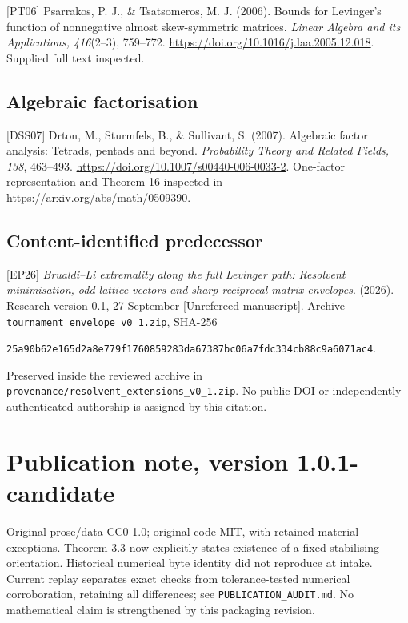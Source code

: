 \documentclass[
  11pt,
  a4paper,
]{article}
\begin{document}
{[}PT06{]} Psarrakos, P. J., \& Tsatsomeros, M. J. (2006). Bounds for
Levinger's function of nonnegative almost skew-symmetric matrices.
\emph{Linear Algebra and its Applications, 416}(2--3), 759--772.
\url{https://doi.org/10.1016/j.laa.2005.12.018}. Supplied full text
inspected.

\subsection{Algebraic factorisation}\label{algebraic-factorisation}

{[}DSS07{]} Drton, M., Sturmfels, B., \& Sullivant, S. (2007). Algebraic
factor analysis: Tetrads, pentads and beyond. \emph{Probability Theory
and Related Fields, 138}, 463--493.
\url{https://doi.org/10.1007/s00440-006-0033-2}. One-factor
representation and Theorem 16 inspected in
\url{https://arxiv.org/abs/math/0509390}.

\subsection{Content-identified
predecessor}\label{content-identified-predecessor}

{[}EP26{]} \emph{Brualdi--Li extremality along the full Levinger path:
Resolvent minimisation, odd lattice vectors and sharp reciprocal-matrix
envelopes}. (2026). Research version 0.1, 27 September {[}Unrefereed
manuscript{]}. Archive \texttt{tournament\_envelope\_v0\_1.zip}, SHA-256

\texttt{25a90b62e165d2a8e779f1760859283da67387bc06a7fdc334cb88c9a6071ac4}.

Preserved inside the reviewed archive in
\texttt{provenance/resolvent\_extensions\_v0\_1.zip}. No public DOI or
independently authenticated authorship is assigned by this citation.

\endgroup

\section*{Publication note, version 1.0.1-candidate}
Original prose/data CC0-1.0; original code MIT, with retained-material exceptions. Theorem 3.3 now explicitly states existence of a fixed stabilising orientation. Historical numerical byte identity did not reproduce at intake. Current replay separates exact checks from tolerance-tested numerical corroboration, retaining all differences; see \texttt{PUBLICATION\_AUDIT.md}. No mathematical claim is strengthened by this packaging revision.
\end{document}
